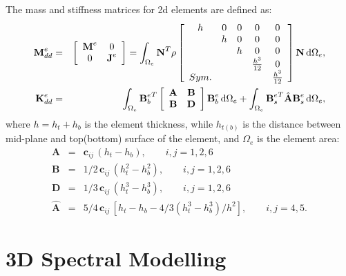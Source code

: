 \documentclass[11pt,a4paper,final]{report}
\begin{document}
The mass and stiffness matrices for \ac{2d} elements are defined as:
\begin{eqnarray}
	\textbf{M}_{dd}^e & = &
	\left [
	\begin{array}{cc}
		\textbf{M}^e & 0\\
		0 & \textbf{J}^e
	\end{array}
	\right] =
	\int_{\Omega_e}\textbf{N}^T\rho
	\left [
	\begin{array}{ccccc}
		h & 0 & 0 & 0 & 0 \\
		& h & 0 & 0 & 0 \\
		&  & h & 0 & 0\\
		&  &  & \frac{h^3}{12} & 0\\
		Sym. &  &  &  & \frac{h^3}{12}
	\end{array} \right]
	\textbf{N} \mathop{}\!\mathrm{d}\Omega_e,\\
	\textbf{K}_{dd}^e & = & \int_{\Omega_e}{\textbf{B}_b^e}^T
	\left[
	\begin{array}{cc}
		\textbf{A} & \textbf{B}\\
		\textbf{B} & \textbf{D}
	\end{array} \right]
	\textbf{B}_b^e \mathop{}\!\mathrm{d} \Omega_e+\int_{\Omega_e}{\textbf{B}_s^e}^T\hat{\textbf{A}}\textbf{B}_s^e\mathop{}\!\mathrm{d} \Omega_e,
\end{eqnarray}
where \(h=h_t+h_b\) is the element thickness, while \(h_{t(b)}\) is the distance between mid-plane and top(bottom) surface of the element, and \(\Omega_e\) is the element area:
\begin{eqnarray}
	\textbf{A} & = & \textbf{c}_{ij}\,(h_t-h_b),\qquad i,j=1,2,6\nonumber\\
	\textbf{B} & = & 1/2\, \textbf{c}_{ij}\,(h_t^2-h_b^2),\qquad i,j=1,2,6\nonumber\\
	\textbf{D} & = & 1/3\, \textbf{c}_{ij}\,(h_t^3-h_b^3),\qquad i,j=1,2,6\nonumber\\
	\hat{\textbf{A}} & = & 5/4\, \textbf{c}_{ij}\,\left[h_t-h_b-4/3\left(h_t^3-h_b^3\right)/h^2\right],\qquad i,j=4,5.
\end{eqnarray}
 \section{3D Spectral Modelling}
\label{sec:3Dmodel}
\end{document}
